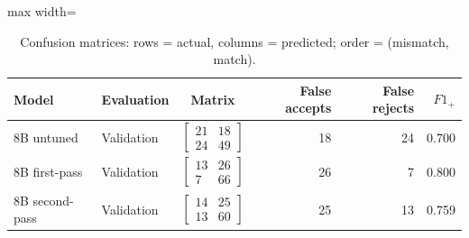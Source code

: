 \begin{table}[htbp]
\centering
\caption{Confusion matrices: rows = actual, columns = predicted; order = (mismatch, match).}
\label{tab:statements-confusion}
\small
\begin{adjustbox}{max width=\textwidth}
\begin{tabular}{llcrrr}
\toprule
Model & Evaluation & Matrix & False accepts & False rejects & $F1_+$ \\
\midrule
8B untuned & Validation & $\left[\begin{array}{rr}21&18\\24&49\end{array}\right]$ & 18 & 24 & 0.700 \\
8B first-pass & Validation & $\left[\begin{array}{rr}13&26\\7&66\end{array}\right]$ & 26 & 7 & 0.800 \\
8B second-pass & Validation & $\left[\begin{array}{rr}14&25\\13&60\end{array}\right]$ & 25 & 13 & 0.759 \\
\bottomrule
\end{tabular}
\end{adjustbox}
\end{table}
